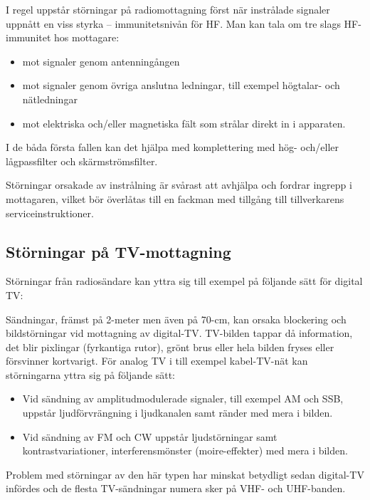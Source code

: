 I regel uppstår störningar på radiomottagning först när instrålade signaler
uppnått en viss styrka -- immunitetsnivån för HF.
Man kan tala om tre slags HF-immunitet hos mottagare:

\begin{itemize}
\item mot signaler genom antenningången
\item mot signaler genom övriga anslutna ledningar, till exempel högtalar-
  och nätledningar
\item mot elektriska och/eller magnetiska fält som strålar direkt in i
  apparaten.
\end{itemize}

I de båda första fallen kan det hjälpa med komplettering med hög- och/eller
lågpassfilter och skärmströmsfilter.

Störningar orsakade av instrålning är svårast att avhjälpa och fordrar ingrepp i
mottagaren, vilket bör överlåtas till en fackman med tillgång till
tillverkarens serviceinstruktioner.

\subsection{Störningar på TV-mottagning}

Störningar från radiosändare kan yttra sig till exempel på följande sätt för
digital TV:

Sändningar, främst på 2-meter men även på 70-cm, kan orsaka blockering och
bildstörningar vid mottagning av digital-TV.
TV-bilden tappar då information, det blir pixlingar (fyrkantiga rutor), grönt
brus eller hela bilden fryses eller försvinner kortvarigt.
För analog TV i till exempel kabel-TV-nät kan störningarna yttra sig på
följande sätt:

\begin{itemize}
\item Vid sändning av amplitudmodulerade signaler, till exempel AM och SSB,
  uppstår ljudförvrängning i ljudkanalen samt ränder med mera i bilden.
\item Vid sändning av FM och CW uppstår ljudstörningar samt
  kontrastvariationer, interferensmönster (moire-effekter) med mera i bilden.
\end{itemize}

Problem med störningar av den här typen har minskat betydligt sedan digital-TV
infördes och de flesta TV-sändningar numera sker på VHF- och UHF-banden.

